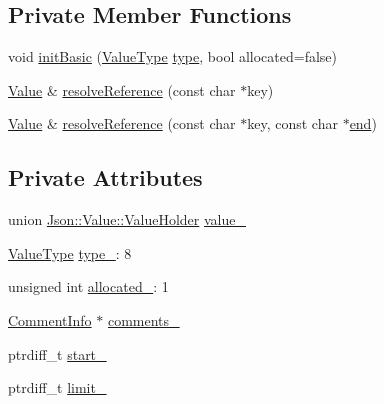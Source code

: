 \subsection*{Private Member Functions}
\begin{DoxyCompactItemize}
\item 
void \hyperlink{classJson_1_1Value_a32b86b71564157f40f880f5736be822a_a32b86b71564157f40f880f5736be822a}{init\+Basic} (\hyperlink{namespaceJson_a7d654b75c16a57007925868e38212b4e_a7d654b75c16a57007925868e38212b4e}{Value\+Type} \hyperlink{classJson_1_1Value_a8ce61157a011894f0252ceed232312de_a8ce61157a011894f0252ceed232312de}{type}, bool allocated=false)
\item 
\hyperlink{classJson_1_1Value}{Value} \& \hyperlink{classJson_1_1Value_a9ff9cdae2c8f4155bab603d750b0b3f1_a9ff9cdae2c8f4155bab603d750b0b3f1}{resolve\+Reference} (const char $\ast$key)
\item 
\hyperlink{classJson_1_1Value}{Value} \& \hyperlink{classJson_1_1Value_a5f6b3aaf4f2e952a33dd823db008c333_a5f6b3aaf4f2e952a33dd823db008c333}{resolve\+Reference} (const char $\ast$key, const char $\ast$\hyperlink{classJson_1_1Value_a3e443cd0ef24f7e028b175e47ee045e0_a3e443cd0ef24f7e028b175e47ee045e0}{end})
\end{DoxyCompactItemize}
\subsection*{Private Attributes}
\begin{DoxyCompactItemize}
\item 
union \hyperlink{unionJson_1_1Value_1_1ValueHolder}{Json\+::\+Value\+::\+Value\+Holder} \hyperlink{classJson_1_1Value_aef578244546212705b9f81eb84d7e151_aef578244546212705b9f81eb84d7e151}{value\+\_\+}
\item 
\hyperlink{namespaceJson_a7d654b75c16a57007925868e38212b4e_a7d654b75c16a57007925868e38212b4e}{Value\+Type} \hyperlink{classJson_1_1Value_abd222c2536dc88bf330dedcd076d2356_abd222c2536dc88bf330dedcd076d2356}{type\+\_\+}\+: 8
\item 
unsigned int \hyperlink{classJson_1_1Value_ae0126c80dc4907aad94088553fc7632b_ae0126c80dc4907aad94088553fc7632b}{allocated\+\_\+}\+: 1
\item 
\hyperlink{structJson_1_1Value_1_1CommentInfo}{Comment\+Info} $\ast$ \hyperlink{classJson_1_1Value_a2016564cabc7a29208e97bd0b782a4e4_a2016564cabc7a29208e97bd0b782a4e4}{comments\+\_\+}
\item 
ptrdiff\+\_\+t \hyperlink{classJson_1_1Value_a1c3aeb0fa8fefe93776cb347c76a25a8_a1c3aeb0fa8fefe93776cb347c76a25a8}{start\+\_\+}
\item 
ptrdiff\+\_\+t \hyperlink{classJson_1_1Value_afe377e25f6d3b5b8ea7221c84f29412a_afe377e25f6d3b5b8ea7221c84f29412a}{limit\+\_\+}
\end{DoxyCompactItemize}
